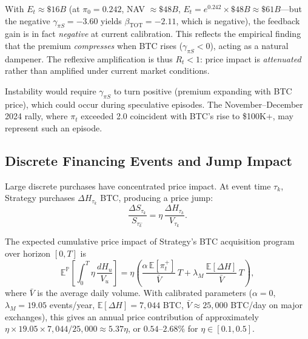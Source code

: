 \begin{remark}
With $E_t \approx \$16B$ (at $\pi_0 = 0.242$, NAV $\approx \$48B$,
$E_t = e^{0.242}\times\$48B\approx\$61B$---but the negative $\gamma_{\pi S} = -3.60$
yields $\beta_{\mathrm{TOT}} = -2.11$, which is negative),
the feedback gain is in fact \emph{negative} at current calibration.
This reflects the empirical finding that the premium \emph{compresses}
when BTC rises ($\gamma_{\pi S} < 0$), acting as a natural dampener.
The reflexive amplification is thus $R_t < 1$: price impact is
\emph{attenuated} rather than amplified under current market conditions.

Instability would require $\gamma_{\pi S}$ to turn positive
(premium expanding with BTC price), which could occur during
speculative episodes. The November--December 2024 rally, where
$\pi_t$ exceeded 2.0 coincident with BTC's rise to \$100K+,
may represent such an episode.
\end{remark}

\subsection{Discrete Financing Events and Jump Impact}

Large discrete purchases have concentrated price impact.
At event time $\tau_k$, Strategy purchases $\Delta H_{\tau_k}$ BTC,
producing a price jump:
\begin{equation}
  \frac{\Delta S_{\tau_k}}{S_{\tau_k^-}}
  = \eta\,\frac{\Delta H_{\tau_k}}{V_{\tau_k}}.
  \label{eq:jump_impact}
\end{equation}

\begin{theorem}
\label{thm:expected_impact}
The expected cumulative price impact of Strategy's BTC acquisition
program over horizon $[0,T]$ is
\begin{equation}
  \mathbb{E}^{\mathbb{P}}\!\left[
    \int_0^T \eta\,\frac{dH_u}{V_u}
  \right]
  = \eta\left(
    \frac{\alpha\,\mathbb{E}[\pi_t^+]}{\bar{V}}\,T
    + \lambda_M\,\frac{\mathbb{E}[\Delta H]}{\bar{V}}\,T
  \right),
  \label{eq:cumulative_impact}
\end{equation}
where $\bar{V}$ is the average daily volume.
With calibrated parameters ($\alpha = 0$,
$\lambda_M = 19.05$ events/year,
$\mathbb{E}[\Delta H] = 7{,}044$ BTC,
$\bar{V} \approx 25{,}000$ BTC/day on major exchanges), this gives
an annual price contribution of approximately
$\eta \times 19.05 \times 7{,}044 / 25{,}000 \approx 5.37\eta$,
or $0.54$--$2.68\%$ for $\eta \in [0.1, 0.5]$.
\end{theorem}


